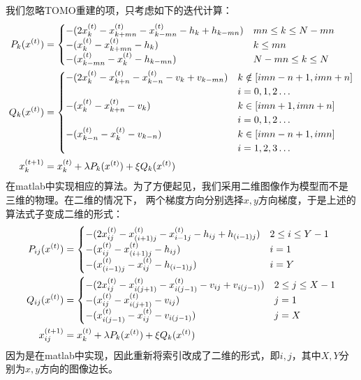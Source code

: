我们忽略TOMO重建的项，只考虑如下的迭代计算：
\begin{align*}
P_k(x^{(t)}) &= \begin{cases}
                            -(2x_k^{(t)} - x_{k+mn}^{(t)} - x_{k-mn}^{(t)} - h_k + h_{k-mn}) & mn \le k \le N-mn \\
                            -(x_k^{(t)} - x_{k+mn}^{(t)} - h_k) &  k\le mn \\
                            -(x_{k-mn}^{(t)} - x_{k}^{(t)} - h_{k-mn}) &  N-mn \le k \le N
                        \end{cases}   \\
Q_k(x^{(t)}) &= \begin{cases}
                            -(2x_k^{(t)} - x_{k+n}^{(t)} - x_{k-n}^{(t)} - v_k + v_{k-mn}) & k \notin [ imn-n+1, imn+n]
                            \\ &i = 0,1,2\hdots\\
                            -(x_k^{(t)} - x_{k+n}^{(t)} - v_k) & k \in \left[imn+1,imn+n\right] \\ &i = 0,1,2\hdots\\
                            -(x_{k-n}^{(t)} - x_{k}^{(t)} - v_{k-n}) &  k \in [imn-n+1,imn] \\ &i= 1,2,3 \hdots
                        \end{cases}  \\
x_k^{(t+1)}&= x_k^{(t)} + \lambda P_k(x^{(t)}) + \xi Q_k(x^{(t)}) 
\end{align*}
在matlab中实现相应的算法。为了方便起见，我们采用二维图像作为模型而不是三维的物理。在二维的情况下，
两个梯度方向分别选择$x,y$方向梯度，于是上述的算法式子变成二维的形式：
\begin{align*}
P_{ij}(x^{(t)}) &= \begin{cases}
                            -(2x_{ij}^{(t)} - x_{(i+1)j}^{(t)} - x_{{i-1}j}^{(t)} - h_{ij} + h_{(i-1)j}) & 2 \le i \le Y-1 \\
                            -(x_{ij}^{(t)} - x_{(i+1)j}^{(t)} - h_{ij}) &  i = 1 \\
                            -(x_{(i-1)j}^{(t)} - x_{ij}^{(t)} - h_{(i-1)j}) &  i = Y
                        \end{cases}   \\
Q_{ij}(x^{(t)}) &= \begin{cases}
                            -(2x_{ij}^{(t)} - x_{i(j+1)}^{(t)} - x_{i(j-1)}^{(t)} - v_{ij} + v_{i(j-1)}) & 2 \le j \le X-1\\
                            -(x_{ij}^{(t)} - x_{i(j+1)}^{(t)} - v_{ij}) &  j = 1 \\
                            -(x_{i(j-1)}^{(t)} - x_{ij}^{(t)} - v_{i(j-1)}) &  j = X
                        \end{cases}  \\
x_{ij}^{(t+1)}&= x_k^{(t)} + \lambda P_k(x^{(t)}) + \xi Q_k(x^{(t)})
\end{align*}
因为是在matlab中实现，因此重新将索引改成了二维的形式，即$i,j$，其中$X,Y$分别为$x,y$方向的图像边长。

